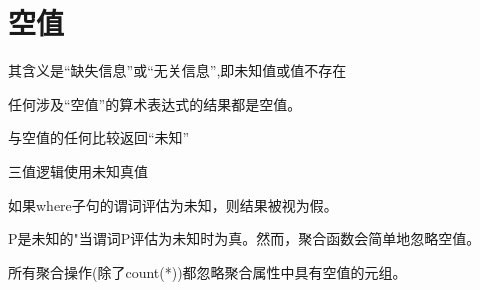 \section{空值}

其含义是“缺失信息”或“无关信息”,即未知值或值不存在

任何涉及“空值”的算术表达式的结果都是空值。

与空值的任何比较返回“未知”

三值逻辑使用未知真值

如果where子句的谓词评估为未知，则结果被视为假。

P是未知的"当谓词P评估为未知时为真。然而，聚合函数会简单地忽略空值。

所有聚合操作(除了count(*))都忽略聚合属性中具有空值的元组。